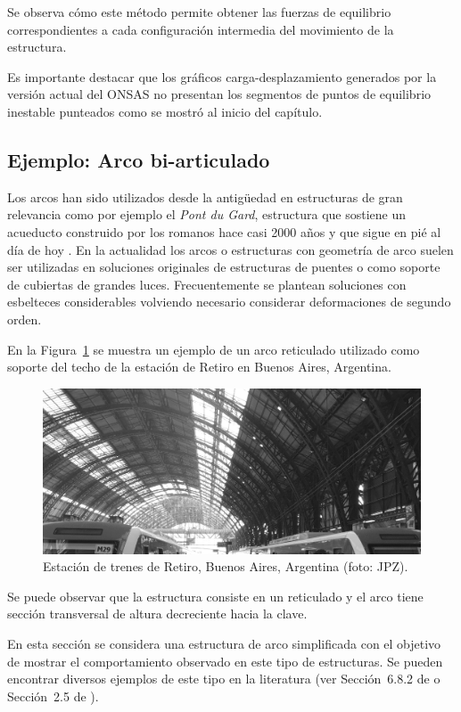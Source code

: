 Se observa cómo este método permite obtener las fuerzas de equilibrio correspondientes a cada configuración intermedia del movimiento de la estructura. %
%

Es importante destacar que los gráficos carga-desplazamiento generados por la versión actual del ONSAS no presentan los segmentos de puntos de equilibrio inestable punteados como se mostró al inicio del capítulo. %
%


\subsection{Ejemplo: Arco bi-articulado} \label{sec:ejarco}

Los arcos han sido utilizados desde la antigüedad en estructuras de gran relevancia como por ejemplo el \textit{Pont du Gard}, estructura que sostiene un acueducto construido por los romanos hace casi 2000 años y que sigue en pié al día de hoy \citep{Timoshenko1953}. %
%
En la actualidad los arcos o estructuras con geometría de arco suelen ser utilizadas en soluciones originales de estructuras de puentes o como soporte de cubiertas de grandes luces. %
%
Frecuentemente se plantean soluciones con esbelteces considerables volviendo necesario considerar deformaciones de segundo orden. %


En la Figura~\ref{fig:retiro} se muestra un ejemplo de un arco reticulado utilizado como soporte del techo de la estación de Retiro en Buenos Aires, Argentina. %
%
\begin{figure}[htb]
	\centering
	\includegraphics[width=\textwidth]{../fig/arcos_retiro}
	\caption{Estación de trenes de Retiro, Buenos Aires, Argentina (foto: JPZ).}
	\label{fig:retiro}
\end{figure}
%
Se puede observar que la estructura consiste en un reticulado y el arco tiene sección transversal de altura decreciente hacia la clave.

En esta sección se considera una estructura de arco simplificada con el objetivo de mostrar el comportamiento observado en este tipo de estructuras. %
%
Se pueden encontrar diversos ejemplos de este tipo en la literatura (ver Sección~6.8.2 de \citep{Bathe2014} o Sección~2.5 de \citep{Crisfield1997}).

